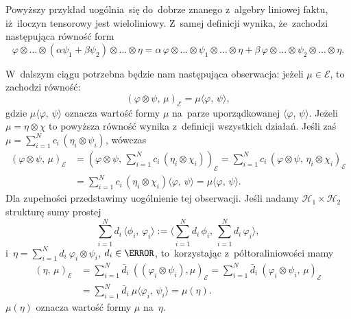 \documentclass[a4paper,11pt]{article}
\newcommand{\ld}{\ldots}
\newcommand{\ld}{\ldots}
\newcommand{\mc}{\mathcal}
\newcommand{\al}{\alpha}
\newcommand{\vp}{\varphi}
\newcommand{\Hc}{\mc{H}}
\newcommand{\ti}{\times}
\newcommand{\ot}{\otimes}
\newcommand{\Sum}{\sum\limits}
\newcommand{\lket}{\langle}
\newcommand{\rket}{\rangle}
\newcommand{\SP}[2]{( #1, \, #2 )}  %
\newcommand{\dket}[2]{\lket #1, \, #2 \rket}  %
\begin{document}
Powyższy przykład uogólnia~się do~dobrze znanego z~algebry liniowej
faktu, iż~iloczyn tensorowy jest wieloliniowy. Z~samej definicji
wynika, że~zachodzi następująca równość form
\begin{equation*}
  \vp \ot \ld \ot ( \al \psi_{ 1 } + \beta \psi_{ 2 } ) \ot \ld \ot \eta
  = \al \, \vp \ot \ld \ot \psi_{ 1 } \ot \ld \ot \eta
  + \beta \, \vp \ot \ld \ot \psi_{ 2 } \ot \ld \ot \eta.
\end{equation*}

W~dalszym ciągu potrzebna będzie nam następująca obserwacja: jeżeli
$\mu \in \mc{E}$, to zachodzi równość:
\begin{equation*}
  \SP{ \vp \ot \psi }{ \mu }_{ \mc{E} } = \mu\dket{ \vp }{ \psi },
\end{equation*}
gdzie $\mu\dket{ \vp }{ \psi }$ oznacza wartość formy $\mu$ na~parze
uporządkowanej $\dket{ \vp }{ \psi }$. Jeżeli $\mu = \eta \ot \chi$ to
powyższa równość wynika z~definicji wszystkich działań. Jeśli zaś
$\mu = \Sum_{ i = 1 }^{ N } c_{ i } \, ( \eta_{ i } \ot \psi_{ i } )$,
wówczas
\begin{equation*}
  \begin{split}
    \SP{ \vp \ot \psi }{ \mu }_{ \mc{E} } &= \left( \vp \ot \psi, \,
      \Sum_{ i = 1 }^{ N } c_{ i } \, ( \eta_{ i } \ot \chi_{ i } )
    \right)_{ \mc{E} } = \Sum_{ i = 1 }^{ N } c_{ i } \, \SP{ \vp \ot
      \psi }
    { \eta_{ i } \ot \chi_{ i } }_{ \mc{E} } \\
    &= \Sum_{ i = 1 }^{ N } c_{ i } \, ( \eta_{ i } \ot \chi_{ i } )
    \dket{ \vp }{ \psi } = \mu\dket{ \vp }{ \psi }.
  \end{split}
\end{equation*}
Dla zupełności przedstawimy uogólnienie tej obserwacji. Jeśli nadamy
$\Hc_{ 1 } \ti \Hc_{ 2 }$ strukturę sumy prostej
\begin{equation}
  \label{eq:4}
  \Sum_{ i = 1 }^{ N } d_{ i } \, \dket{ \phi_{ i } }{ \vp_{ i } }
  := \lket \Sum_{ i = 1 }^{ N } d_{ i } \, \phi_{ i }, \,
  \Sum_{ i = 1 }^{ N } d_{ i } \, \vp_{ i } \rket,
\end{equation}
i~$\eta = \Sum_{ i = 1 }^{ N } d_{ i } \: \vp_{ i } \ot \psi_{ i }$,
$d_{ i } \in \C$, to~korzystając z~półtoraliniowości mamy
\begin{equation*}
  \begin{split}
    ( \eta, \, \mu )_{ \mc{E} } &= \Sum_{ i = 1 }^{ N } \bar{ d }_{ i
    } \: ( ( \vp_{ i } \ot \psi_{ i } ), \mu )_{ \mc{E} } = \Sum_{ i =
      1 }^{ N } \bar{ d }_{ i } \:
    \SP{ \vp_{ i } \ot \psi_{ i } }{ \mu }_{ \mc{E} } \\
    &= \Sum_{ i = 1 }^{ N } \bar{ d }_{ i } \: \mu \lket \vp_{ i }, \,
    \psi_{ i } \rket = \mu( \eta ).
  \end{split}
\end{equation*}
$\mu( \eta )$ oznacza wartość formy $\mu$ na~$\eta$.
\end{document}
